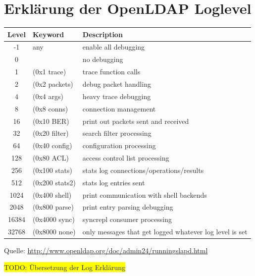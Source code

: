 \documentclass[11pt,a4paper,titlepage=firstiscover,headsepline,bibtotoc]{scrartcl} %
\newcommand{\hilight}[1]{\colorbox{yellow}{#1}} %
\begin{document}
\newpage
\section{Erklärung der OpenLDAP Loglevel} \label{sec:LDAP-Loglevel}
\begin{tabularx}{\textwidth}{|c|l|X|}
\hline
Level &	Keyword &	Description\\
\hline
-1 &	any &	enable all debugging\\
\hline
0 &	  &	no debugging\\
\hline
1 &	(0x1 trace) &	trace function calls\\
\hline
2 &	(0x2 packets) &	debug packet handling\\
\hline
4 &	(0x4 args) &	heavy trace debugging\\
\hline
8 &	(0x8 conns)& 	connection management\\
\hline
16 &	(0x10 BER) & 	print out packets sent and received\\
\hline
32 &	(0x20 filter) &	search filter processing\\
\hline
64 &	(0x40 config) &	configuration processing\\
\hline
128 &	(0x80 ACL) &	access control list processing\\
\hline
256 &	(0x100 stats) &	stats log connections/operations/results\\
\hline
512 &	(0x200 stats2) &	stats log entries sent\\
\hline
1024 &	(0x400 shell) &	print communication with shell backends\\
\hline
2048 &	(0x800 parse) &	print entry parsing debugging\\
\hline
16384 &	(0x4000 sync) &	syncrepl consumer processing\\
\hline
32768 &	(0x8000 none) &	only messages that get logged whatever log level is set \\
\hline
\end{tabularx}
\noindent Quelle: \url{http://www.openldap.org/doc/admin24/runningslapd.html}

\noindent\hilight{TODO: Übersetzung der Log Erklärung}

\newpage
\end{document}
